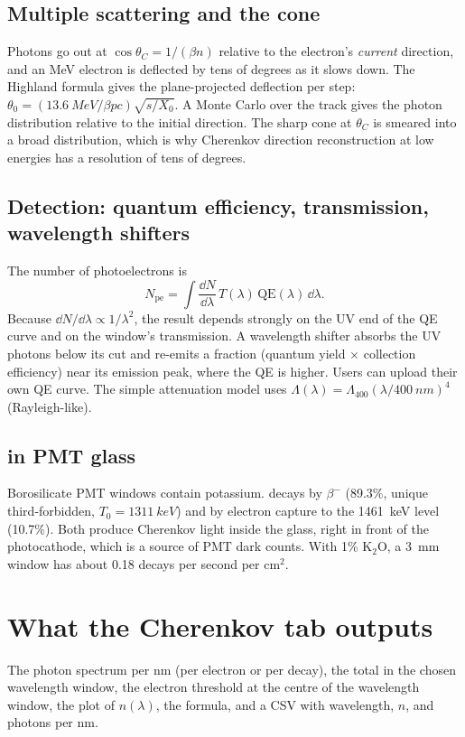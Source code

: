 \subsection{Multiple scattering and the cone}
Photons go out at $\cos\theta_C = 1/(\beta n)$ relative to the electron's \emph{current} direction, and an MeV electron is deflected by tens of degrees as it slows down. The Highland formula gives the plane-projected deflection per step: $\theta_0 = (\SI{13.6}{MeV}/\beta pc)\sqrt{s/X_0}$. A Monte Carlo over the track gives the photon distribution relative to the initial direction. The sharp cone at $\theta_C$ is smeared into a broad distribution, which is why Cherenkov direction reconstruction at low energies has a resolution of tens of degrees.

\subsection{Detection: quantum efficiency, transmission, wavelength shifters}
The number of photoelectrons is
\begin{equation}
N_\text{pe} = \int \frac{\dd N}{\dd\lambda}\,T(\lambda)\,\text{QE}(\lambda)\,\dd\lambda .
\end{equation}
Because $\dd N/\dd\lambda \propto 1/\lambda^2$, the result depends strongly on the UV end of the QE curve and on the window's transmission. A wavelength shifter absorbs the UV photons below its cut and re-emits a fraction (quantum yield $\times$ collection efficiency) near its emission peak, where the QE is higher. Users can upload their own QE curve. The simple attenuation model uses $\Lambda(\lambda) = \Lambda_{400}(\lambda/\SI{400}{nm})^4$ (Rayleigh-like).

\subsection{ in PMT glass}
Borosilicate PMT windows contain potassium.  decays by $\beta^-$ (89.3\%, unique third-forbidden, $T_0 = \SI{1311}{keV}$) and by electron capture to the \SI{1461}{keV} level (10.7\%). Both produce Cherenkov light inside the glass, right in front of the photocathode, which is a source of PMT dark counts. With 1\% K$_2$O, a \SI{3}{mm} window has about 0.18 decays per second per cm$^2$.
\section{What the Cherenkov tab outputs}
The photon spectrum per nm (per electron or per decay), the total in the chosen wavelength window, the electron threshold at the centre of the wavelength window, the plot of $n(\lambda)$, the formula, and a CSV with wavelength, $n$, and photons per nm.

